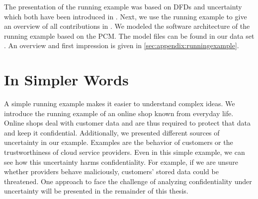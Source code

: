 The presentation of the running example was based on \acp{DFD} and uncertainty which both have been introduced in .
Next, we use the running example to give an overview of all contributions in .
We modeled the software architecture of the running example based on the \acf{PCM}.
The model files can be found in our data set \cite{dataset}.
An overview and first impression is given in \autoref{sec:appendix:runningexample}.





\section{In Simpler Words}%
\label{sec:runningexample:simple}

A simple running example makes it easier to understand complex ideas.
We introduce the running example of an online shop known from everyday life.
Online shops deal with customer data and are thus required to protect that data and keep it confidential.
Additionally, we presented different sources of uncertainty in our example.
Examples are the behavior of customers or the trustworthiness of cloud service providers.
Even in this simple example, we can see how this uncertainty harms confidentiality.
For example, if we are unsure whether providers behave maliciously, customers' stored data could be threatened.
One approach to face the challenge of analyzing confidentiality under uncertainty will be presented in the remainder of this thesis.